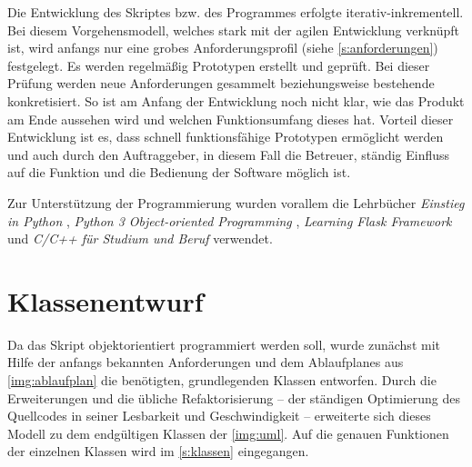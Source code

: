\documentclass[a4paper,12pt,bibliography=totoc, listof=totoc,titlepage,pointlessnumbers]{scrreprt}
\begin{document}
Die Entwicklung des Skriptes bzw. des Programmes erfolgte iterativ-inkrementell. Bei diesem Vorgehensmodell, welches stark mit der agilen Entwicklung verknüpft ist, wird anfangs nur eine grobes Anforderungsprofil (siehe \autoref{s:anforderungen}) festgelegt. Es werden regelmäßig Prototypen erstellt und geprüft. Bei dieser Prüfung werden neue Anforderungen gesammelt beziehungsweise bestehende konkretisiert. So ist am Anfang der Entwicklung noch nicht klar, wie das Produkt am Ende aussehen wird und welchen Funktionsumfang dieses hat. Vorteil dieser Entwicklung ist es, dass schnell funktionsfähige Prototypen ermöglicht werden und auch durch den Auftraggeber, in diesem Fall die Betreuer, ständig Einfluss auf die Funktion und die Bedienung der Software möglich ist. \citep[S. 33f]{uml}

Zur Unterstützung der Programmierung wurden vorallem die Lehrbücher \textit{Einstieg in Python} \citep{python}, \textit{Python 3 Object-oriented Programming} \citep{python3oop}, \textit{Learning Flask Framework} \citep{flask} und \textit{C/C++ für Studium und Beruf} \citep{cpp} verwendet.

\section{Klassenentwurf}
Da das Skript objektorientiert programmiert werden soll, wurde zunächst mit Hilfe der anfangs bekannten Anforderungen und dem Ablaufplanes aus \autoref{img:ablaufplan} die benötigten, grundlegenden Klassen entworfen. Durch die Erweiterungen und die übliche Refaktorisierung -- der ständigen Optimierung des Quellcodes in seiner Lesbarkeit und Geschwindigkeit \citep[S. 255]{uml} -- erweiterte sich dieses Modell zu dem endgültigen Klassen der \autoref{img:uml}. Auf die genauen Funktionen der einzelnen Klassen wird im \autoref{s:klassen} eingegangen.
\end{document}
